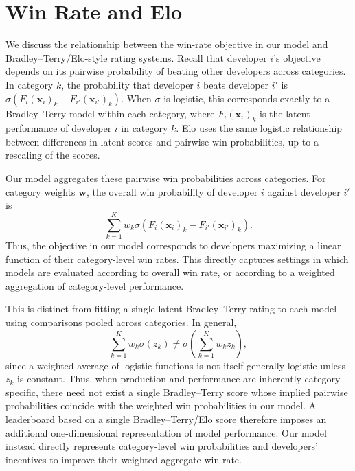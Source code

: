 \section{Win Rate and Elo}
\label{app:elo}

We discuss the relationship between the win-rate objective in our model and Bradley--Terry/Elo-style rating systems.
Recall that developer $i$'s objective depends on its pairwise probability of beating other developers across categories.
In category $k$, the probability that developer $i$ beats developer $i'$ is $\sigma\left(
F_{i}(\mathbf{x}_i)_k-F_{i'}(\mathbf{x}_{i'})_k
\right)$.
When $\sigma$ is logistic, this corresponds exactly to a Bradley--Terry model within each category, where $F_{i}(\mathbf{x}_i)_k$ is the latent performance of developer $i$ in category $k$.
Elo uses the same logistic relationship between differences in latent scores and pairwise win probabilities, up to a rescaling of the scores.

Our model aggregates these pairwise win probabilities across categories.
For category weights $\mathbf{w}$, the overall win probability of developer $i$ against developer $i'$ is
\[
\sum_{k=1}^K w_k
\sigma\left(
F_{i}(\mathbf{x}_i)_k-F_{i'}(\mathbf{x}_{i'})_k
\right).
\]
Thus, the objective in our model corresponds to developers maximizing a linear function of their category-level win rates.
This directly captures settings in which models are evaluated according to overall win rate, or according to a weighted aggregation of category-level performance.

This is distinct from fitting a single latent Bradley--Terry rating to each model using comparisons pooled across categories.
In general,
\[
\sum_{k=1}^K w_k \sigma(z_k)
\neq
\sigma\left(\sum_{k=1}^K w_k z_k\right),
\]
since a weighted average of logistic functions is not itself generally logistic unless $z_k$ is constant.
Thus, when production and performance are inherently category-specific, there need not exist a single Bradley--Terry score whose implied pairwise probabilities coincide with the weighted win probabilities in our model.
A leaderboard based on a single Bradley--Terry/Elo score therefore imposes an additional one-dimensional representation of model performance.
Our model instead directly represents category-level win probabilities and developers' incentives to improve their weighted aggregate win rate.